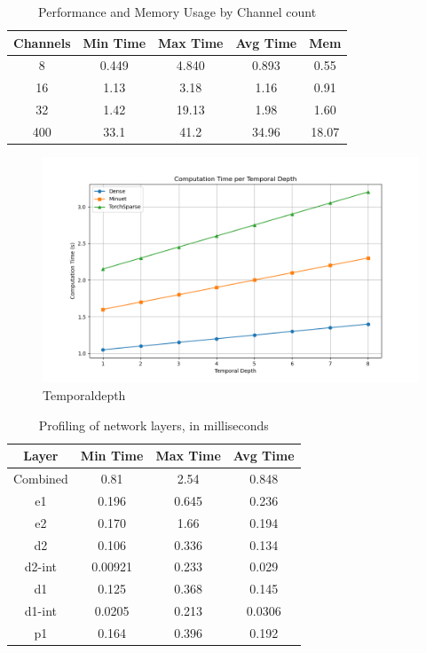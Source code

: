 \begin{table}[ht]
    \centering
    \caption{Performance and Memory Usage by Channel count}
    \begin{tabular}{|c|c|c|c|c|}
        \hline
        Channels & Min Time & Max Time & Avg Time & Mem \\
        \hline
        8   & 0.449 & 4.840 & 0.893 & 0.55   \\
        16   & 1.13 & 3.18 & 1.16 & 0.91 \\
        32 & 1.42 & 19.13 & 1.98 & 1.60 \\
        400 & 33.1 & 41.2 & 34.96 & 18.07 \\
        \hline
    \end{tabular}
    \label{tab:kernel_performance}
\end{table}


\begin{figure}
    \centering
    \includegraphics[width=0.9\linewidth]{figures/Sparsity-temporaldepth.png}
    \caption{Temporaldepth}
    \label{temporaldepth}
\end{figure}

\begin{table}[ht]
    \centering
    \begin{tabular}{|c|c|c|c|}
        \hline
        Layer & Min Time & Max Time & Avg Time \\
        \hline
        Combined   & 0.81 & 2.54 & 0.848  \\
        e1   & 0.196 & 0.645 & 0.236 \\
        e2 & 0.170 & 1.66 & 0.194  \\
        d2 & 0.106 & 0.336 & 0.134  \\
        d2-int & 0.00921 & 0.233 & 0.029  \\
        d1 & 0.125 & 0.368 & 0.145  \\
        d1-int & 0.0205 & 0.213 & 0.0306  \\
        p1 & 0.164 & 0.396 & 0.192  \\
        \hline
    \end{tabular}
    \caption{Profiling of network layers, in milliseconds}
    \label{tab:kernel_performance}
\end{table}

